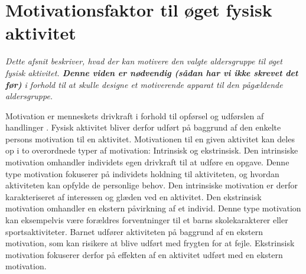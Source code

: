 \section{Motivationsfaktor til øget fysisk aktivitet}\label{motivation_boern}
\textit{Dette afsnit beskriver, hvad der kan motivere den valgte aldersgruppe til øget fysisk aktivitet. \textbf{Denne viden er nødvendig (sådan har vi ikke skrevet det før)} i forhold til at skulle designe et motiverende apparat til den pågældende aldersgruppe.}

Motivation er menneskets drivkraft i forhold til opførsel og udførslen af handlinger \citep{V.Brown2007}. Fysisk aktivitet bliver derfor udført på baggrund af den enkelte persons motivation til en aktivitet. Motivationen til en given aktivitet kan deles op i to overordnede typer af motivation: Intrinsisk og ekstrinsisk. Den intrinsiske motivation omhandler individets egen drivkraft til at udføre en opgave. Denne type motivation fokuserer på individets holdning til aktiviteten, og hvordan aktiviteten kan opfylde de personlige behov. Den intrinsiske motivation er derfor karakteriseret af interessen og glæden ved en aktivitet. Den ekstrinsisk motivation omhandler en ekstern påvirkning af et individ. Denne type motivation kan eksempelvis være forældres forventninger til et barns skolekarakterer eller sportsaktiviteter. Barnet udfører aktiviteten på baggrund af en ekstern motivation, som kan risikere at blive udført med frygten for at fejle. Ekstrinsisk motivation fokuserer derfor på effekten af en aktivitet udført med en ekstern motivation. \citep{J.Sebire2013} 

